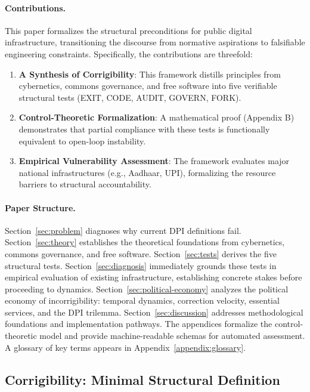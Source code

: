 \documentclass{article}
\begin{document}
\paragraph{Contributions.} This paper formalizes the structural preconditions for public digital infrastructure, transitioning the discourse from normative aspirations to falsifiable engineering constraints. Specifically, the contributions are threefold:
\begin{enumerate}[noitemsep]
    \item \textbf{A Synthesis of Corrigibility}: This framework distills principles from cybernetics, commons governance, and free software into five verifiable structural tests (EXIT, CODE, AUDIT, GOVERN, FORK).
    \item \textbf{Control-Theoretic Formalization}: A mathematical proof (Appendix B) demonstrates that partial compliance with these tests is functionally equivalent to open-loop instability.
    \item \textbf{Empirical Vulnerability Assessment}: The framework evaluates major national infrastructures (e.g., Aadhaar, UPI), formalizing the resource barriers to structural accountability.
\end{enumerate}

\paragraph{Paper Structure.} Section~\ref{sec:problem} diagnoses why current DPI definitions fail. Section~\ref{sec:theory} establishes the theoretical foundations from cybernetics, commons governance, and free software. Section~\ref{sec:tests} derives the five structural tests. Section~\ref{sec:diagnosis} immediately grounds these tests in empirical evaluation of existing infrastructure, establishing concrete stakes before proceeding to dynamics. Section~\ref{sec:political-economy} analyzes the political economy of incorrigibility: temporal dynamics, correction velocity, essential services, and the DPI trilemma. Section~\ref{sec:discussion} addresses methodological foundations and implementation pathways. The appendices formalize the control-theoretic model and provide machine-readable schemas for automated assessment. A glossary of key terms appears in Appendix~\ref{appendix:glossary}.

\subsection{Corrigibility: Minimal Structural Definition}
\label{subsec:minimal-definition}
\end{document}
